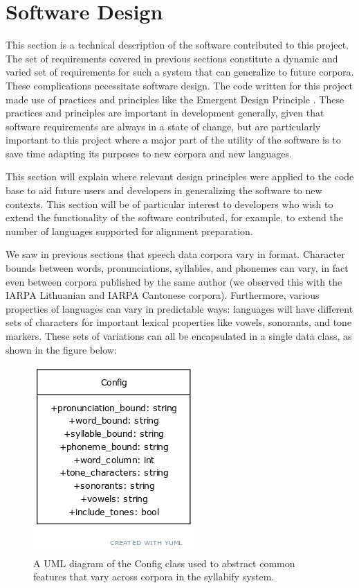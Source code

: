 \documentclass[11pt]{article}
\begin{document}
\section{Software Design}
This section is a technical description of the software contributed to this project. The set of requirements covered in previous sections constitute a dynamic and varied set of requirements for such a system that can generalize to future corpora. These complications necessitate software design. The code written for this project made use of practices and principles like the Emergent Design Principle \cite{bain_emergent_2008}. These practices and principles are important in development generally, given that software requirements are always in a state of change, but are particularly important to this project where a major part of the utility of the software is to save time adapting its purposes to new corpora and new languages. 

This section will explain where relevant design principles were applied to the code base to aid future users and developers in generalizing the software to new contexts. This section will be of particular interest to developers who wish to extend the functionality of the software contributed, for example, to extend the number of languages supported for alignment preparation.

We saw in previous sections that speech data corpora vary in format. Character bounds between words, pronunciations, syllables, and phonemes can vary, in fact even between corpora published by the same author (we observed this with the IARPA Lithuanian and IARPA Cantonese corpora). Furthermore, various properties of languages can vary in predictable ways: languages will have different sets of characters for important lexical properties like vowels, sonorants, and tone markers. These sets of variations can all be encapsulated in a single data class, as shown in the figure below:

\begin{figure}[h]
\centering
\includegraphics[scale=0.5]{config-uml.png}
\caption{A UML diagram of the Config class used to abstract common features that vary across corpora in the syllabify system.}
\label{fig:config-uml}
\end{figure}
\end{document}
